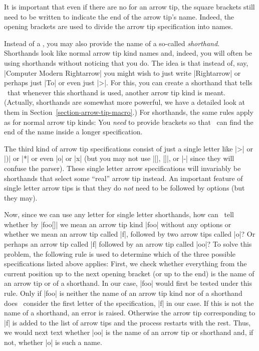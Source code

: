 It is important that even if there are no  for an arrow
tip, the square brackets still need to be written to indicate the end
of the arrow tip's name. Indeed, the opening brackets are used to
divide the arrow tip specification into names.

Instead of a , you may also provide the name
of a so-called \emph{shorthand}. Shorthands look like normal arrow tip
kind names and, indeed, you will often be using shorthands without
noticing that you do. The idea is that instead of, say,
|Computer Modern Rightarrow| you might wish to just write |Rightarrow|
or perhaps just |To| or even just |>|. For this, you can create a
shorthand that tells \tikzname\ that whenever this shorthand is used,
another arrow tip kind is meant. (Actually, shorthands are somewhat
more powerful, we have a detailed look at them in
Section~\ref{section-arrow-tip-macro}.) For shorthands, the same rules
apply as for normal arrow tip kinds: You \emph{need} to provide
brackets so that \tikzname\ can find the end of the name inside a
longer specification.

The third kind of arrow tip specifications consist of just a single
letter like |>| or |)| or |*| or even |o| or |x| (but you may not use
|[|, |]|, or |-| since they will confuse the parser). These single
letter arrow specifications will invariably be shorthands that select
some ``real'' arrow tip instead. An important feature of single letter
arrow tips is that they do \emph{not} need to be followed by options
(but they may).

Now, since we can use any letter for single letter shorthands, how can
\tikzname\ tell whether by |foo[]| we mean an arrow tip kind |foo|
without any options or whether we mean an arrow tip called |f|,
followed by two arrow tips called |o|? Or perhaps an arrow tip called
|f| followed by an arrow tip called |oo|? To solve this problem, the
following rule is used to determine which of the three possible
specifications listed above applies: First, we check whether
everything from the current position up to the next opening bracket
(or up to the end) is the name of an arrow tip or of a shorthand. In
our case, |foo| would first be tested under this rule. Only if |foo|
is neither the name of an arrow tip kind nor of a shorthand does
\tikzname\ consider the first letter of the specification, |f| in our
case. If this is not the name of a shorthand, an error is
raised. Otherwise the arrow tip corresponding to |f| is added to the
list of arrow tips and the process restarts with the rest. Thus, we
would next text whether |oo| is the name of an arrow tip or shorthand
and, if not, whether |o| is such a name.

